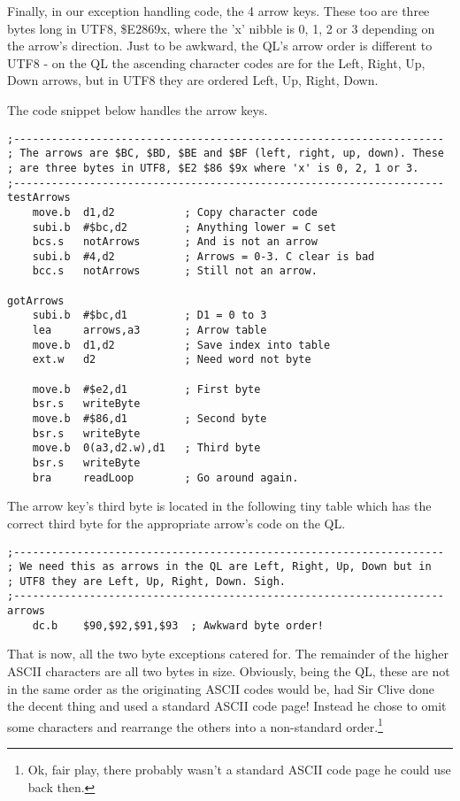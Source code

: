 Finally, in our exception handling code, the 4 arrow keys. These too
are three bytes long in UTF8, \$E2869x, where the 'x' nibble is 0,
1, 2 or 3 depending on the arrow's direction. Just to be awkward,
the QL's arrow order is different to UTF8 - on the QL the ascending
character codes are for the Left, Right, Up, Down arrows, but in UTF8
they are ordered Left, Up, Right, Down. 

The code snippet below handles the arrow keys.

\begin{lstlisting}
;--------------------------------------------------------------------
; The arrows are $BC, $BD, $BE and $BF (left, right, up, down). These
; are three bytes in UTF8, $E2 $86 $9x where 'x' is 0, 2, 1 or 3.
;--------------------------------------------------------------------
testArrows
    move.b  d1,d2           ; Copy character code
    subi.b  #$bc,d2         ; Anything lower = C set
    bcs.s   notArrows       ; And is not an arrow
    subi.b  #4,d2           ; Arrows = 0-3. C clear is bad
    bcc.s   notArrows       ; Still not an arrow.

gotArrows
    subi.b  #$bc,d1         ; D1 = 0 to 3 
    lea     arrows,a3       ; Arrow table
    move.b  d1,d2           ; Save index into table
    ext.w   d2              ; Need word not byte

    move.b  #$e2,d1         ; First byte
    bsr.s   writeByte
    move.b  #$86,d1         ; Second byte
    bsr.s   writeByte
    move.b  0(a3,d2.w),d1   ; Third byte
    bsr.s   writeByte     
    bra     readLoop        ; Go around again.

\end{lstlisting}

The arrow key's third byte is located in the following tiny table
which has the correct third byte for the appropriate arrow's code
on the QL.

\begin{lstlisting}
;--------------------------------------------------------------------
; We need this as arrows in the QL are Left, Right, Up, Down but in
; UTF8 they are Left, Up, Right, Down. Sigh.
;--------------------------------------------------------------------
arrows
    dc.b    $90,$92,$91,$93  ; Awkward byte order!
\end{lstlisting}

That is now, all the two byte exceptions catered for. The remainder
of the higher ASCII characters are all two bytes in size. Obviously,
being the QL, these are not in the same order as the originating ASCII
codes would be, had Sir Clive done the decent thing and used a standard
ASCII code page! Instead he chose to omit some characters and rearrange
the others into a non-standard order.\footnote{Ok, fair play, there probably wasn't a standard ASCII code page he
could use back then. }

